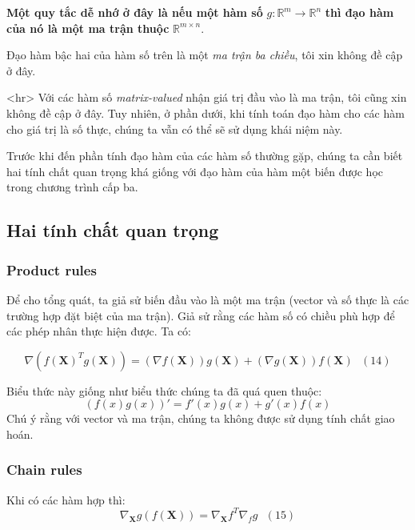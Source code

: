 \documentclass[12pt]{article}
\begin{document}
 
\textbf{Một quy tắc dễ nhớ ở đây là nếu một hàm số} $g: \mathbb{R}^m \rightarrow \mathbb{R}^n$ \textbf{thì đạo hàm của nó là một ma trận thuộc} $\mathbb{R}^{m \times n}$. 
 
Đạo hàm bậc hai của hàm số trên là một \textit{ma trận ba chiều}, tôi xin không đề cập ở đây.  
 

<hr> 
Với các hàm số \textit{matrix-valued} nhận giá trị đầu vào là ma trận, tôi cũng xin không đề cập ở đây. Tuy nhiên, ở phần dưới, khi tính toán đạo hàm cho các hàm cho giá trị là số thực, chúng ta vẫn có thể sẽ sử dụng khái niệm này. 
 
Trước khi đến phần tính đạo hàm của các hàm số thường gặp, chúng ta cần biết hai tính chất quan trọng khá giống với đạo hàm của hàm một biến được học trong chương trình cấp ba.  
 
 
\subsection{Hai tính chất quan trọng }
 
 
\subsubsection{Product rules}
Để cho tổng quát, ta giả sử biến đầu vào là một ma trận (vector và số thực là các trường hợp đặt biệt của ma trận). Giả sử rằng các hàm số có chiều phù hợp để các phép nhân thực hiện được. Ta có:  
 
\begin{equation*} 
\nabla\left( f(\mathbf{X})^Tg(\mathbf{X}) \right) = \left(\nabla f(\mathbf{X})\right) g(\mathbf{X}) + \left(\nabla g(\mathbf{X})\right) f(\mathbf{X}) ~~~ (14) 
\end{equation*} 
 
Biểu thức này giống như biểu thức chúng ta đã quá quen thuộc: 
\begin{equation*} 
\left(f(x)g(x)\right)' = f'(x)g(x) + g'(x)f(x) 
\end{equation*} 
Chú ý rằng với vector và ma trận, chúng ta không được sử dụng tính chất giao hoán.  
 
 
\subsubsection{Chain rules }
Khi có các hàm hợp thì: 
\begin{equation*} 
\nabla_{\mathbf{X}} g(f(\mathbf{X})) = \nabla_{\mathbf{X}} f^T \nabla_{f}g ~~~ (15) 
\end{equation*} 
 
\end{document}
